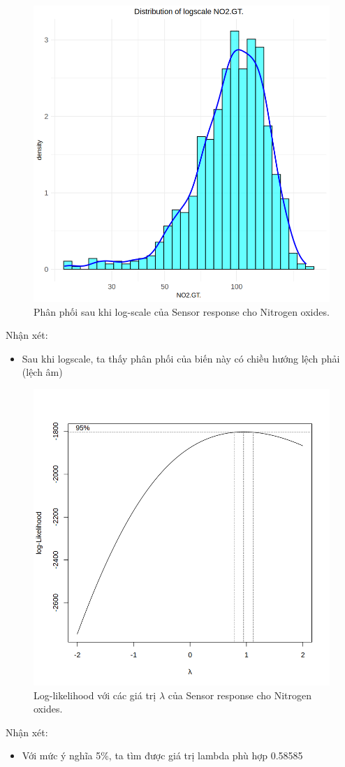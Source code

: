 \begin{figure}[H]
    \centering
    \includegraphics[width=0.75\columnwidth]{air_figures/NO2(GT)_logscale_distribution.png}
    \caption{Phân phối sau khi log-scale của Sensor response cho Nitrogen oxides.}
    \label{fig:no2_logscale_distribution}
\end{figure}
Nhận xét:
\begin{itemize}
    \item Sau khi logscale, ta thấy phân phối của biến này có chiều hướng lệch phải (lệch âm)
\end{itemize}

\begin{figure}[H]
    \centering
    \includegraphics[width=0.75\columnwidth]{air_figures/NO2(GT)_optimal_lambda.png}
    \caption{Log-likelihood với các giá trị $\lambda$ của Sensor response cho Nitrogen oxides.}
    \label{fig:no2_optimal_lambda}
\end{figure}
Nhận xét:
\begin{itemize}
    \item Với mức ý nghĩa 5\%, ta tìm được giá trị lambda phù hợp 0.58585
\end{itemize}

